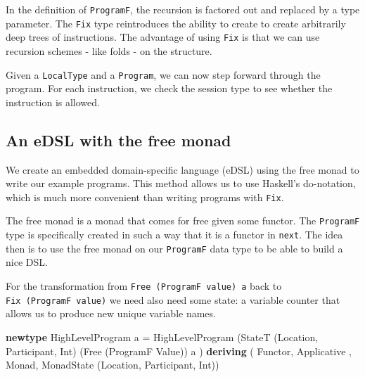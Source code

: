 \documentclass[runningheads]{llncs}
\newenvironment{Shaded}{}{}
\newcommand{\KeywordTok}[1]{\textcolor[rgb]{0.00,0.44,0.13}{\textbf{#1}}}
\newcommand{\DataTypeTok}[1]{\textcolor[rgb]{0.56,0.13,0.00}{#1}}
\newcommand{\FunctionTok}[1]{\textcolor[rgb]{0.02,0.16,0.49}{#1}}
\newcommand{\NormalTok}[1]{#1}
\begin{document}
In the definition of \texttt{ProgramF}, the recursion is factored out
and replaced by a type parameter. The \texttt{Fix} type reintroduces the
ability to create to create arbitrarily deep trees of instructions. The
advantage of using \texttt{Fix} is that we can use recursion schemes -
like folds - on the structure.

Given a \texttt{LocalType} and a \texttt{Program}, we can now step
forward through the program. For each instruction, we check the session
type to see whether the instruction is allowed.

\subsection{An eDSL with the free
monad}\label{an-edsl-with-the-free-monad}

We create an embedded domain-specific language (eDSL) using the free
monad to write our example programs. This method allows us to use
Haskell's do-notation, which is much more convenient than writing
programs with \texttt{Fix}.

The free monad is a monad that comes for free given some functor. The
\texttt{ProgramF} type is specifically created in such a way that it is
a functor in \texttt{next}. The idea then is to use the free monad on
our \texttt{ProgramF} data type to be able to build a nice DSL.

For the transformation from \texttt{Free\ (ProgramF\ value)\ a} back to
\texttt{Fix\ (ProgramF\ value)} we need also need some state: a variable
counter that allows us to produce new unique variable names.

\begin{Shaded}
\begin{Highlighting}[]
\KeywordTok{newtype} \DataTypeTok{HighLevelProgram}\NormalTok{ a }\FunctionTok{=} 
    \DataTypeTok{HighLevelProgram} 
\NormalTok{        (}\DataTypeTok{StateT} 
\NormalTok{            (}\DataTypeTok{Location}\NormalTok{, }\DataTypeTok{Participant}\NormalTok{, }\DataTypeTok{Int}\NormalTok{) }
\NormalTok{            (}\DataTypeTok{Free}\NormalTok{ (}\DataTypeTok{ProgramF} \DataTypeTok{Value}\NormalTok{)) }
\NormalTok{            a}
\NormalTok{        )}
    \KeywordTok{deriving}\NormalTok{ ( }\DataTypeTok{Functor}\NormalTok{, }\DataTypeTok{Applicative}
\NormalTok{             , }\DataTypeTok{Monad}\NormalTok{, }\DataTypeTok{MonadState}\NormalTok{ (}\DataTypeTok{Location}\NormalTok{, }\DataTypeTok{Participant}\NormalTok{, }\DataTypeTok{Int}\NormalTok{))}
\end{Highlighting}
\end{Shaded}
\end{document}
